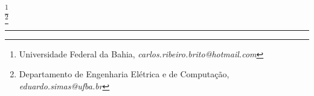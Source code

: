 \documentclass[12pt,a4paper]{article}
\begin{document}
%
%
%
%
%
%
%
%
\pagebreak

\pagestyle{fancyplain}
\fancyhf{}
\rfoot{\thepage}
\setcounter{page}{1}

\hspace{1.5em}

\begin{center}
    {\large \textbf{\titulo}}
\end{center}

\begin{flushleft}
    \textbf{\autor}\footnote{Universidade Federal da Bahia, \textit{carlos.ribeiro.brito@hotmail.com}} \\
    \textbf{\orientador}\footnote{Departamento de Engenharia Elétrica e de Computação, \textit{eduardo.simas@ufba.br}}\\
\end{flushleft}

\hspace{0.5em}
\hrule
\end{document}
